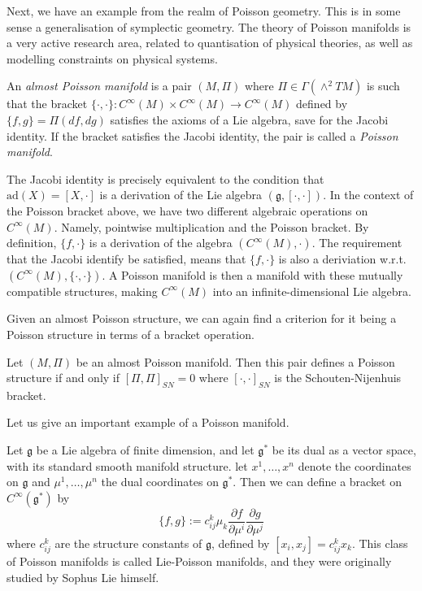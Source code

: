 Next, we have an example from the realm of Poisson geometry. This is in some sense a generalisation of symplectic geometry. The theory of Poisson manifolds is a very active research area, related to quantisation of physical theories, as well as modelling constraints on physical systems.
\begin{definition}
  An \emph{almost Poisson manifold} is a pair $(M,\Pi)$ where $\Pi\in\Gamma(\wedge^2TM)$ is such that the bracket $\{\cdot,\cdot\}:C^\infty(M)\times C^\infty(M)\to C^\infty(M)$ defined by $\{f,g\}=\Pi(df,dg)$ satisfies the axioms of a Lie algebra, save for the Jacobi identity. If the bracket satisfies the Jacobi identity, the pair is called a \emph{Poisson manifold}.
\end{definition}
\begin{remark}
  The Jacobi identity is precisely equivalent to the condition that $\text{ad}(X)=[X,\cdot]$ is a derivation of the Lie algebra $(\mathfrak{g},[\cdot,\cdot])$. In the context of the Poisson bracket above, we have two different algebraic operations on $C^\infty(M)$. Namely, pointwise multiplication and the Poisson bracket. By definition, $\{f,\cdot\}$ is a derivation of the algebra $(C^\infty(M),\cdot)$. The requirement that the Jacobi identify be satisfied, means that $\{f,\cdot\}$ is also a deriviation w.r.t. $(C^\infty(M),\{\cdot,\cdot\})$. A Poisson manifold is then a manifold with these mutually compatible structures, making $C^\infty(M)$ into an infinite-dimensional Lie algebra.
\end{remark}
Given an almost Poisson structure, we can again find a criterion for it being a Poisson structure in terms of a bracket operation.
\begin{theorem}
  Let $(M,\Pi)$ be an almost Poisson manifold. Then this pair defines a Poisson structure if and only if $[\Pi,\Pi]_{SN}=0$ where $[\cdot,\cdot]_{SN}$ is the Schouten-Nijenhuis bracket.
\end{theorem}
Let us give an important example of a Poisson manifold.
\begin{example}
  Let $\mathfrak{g}$ be a Lie algebra of finite dimension, and let $\mathfrak{g}^*$ be its dual as a vector space, with its standard smooth manifold structure. let $x^1,\dots,x^n$ denote the coordinates on $\mathfrak{g}$ and $\mu^1,\dots,\mu^n$ the dual coordinates on $\mathfrak{g}^*$. Then we can define a bracket on $C^\infty(\mathfrak{g}^*)$ by
  $$\{f,g\}:= c_{ij}^k\mu_k\frac{\partial f}{\partial\mu^i}\frac{\partial g}{\partial\mu^j}$$
  where $c_{ij}^k$ are the structure constants of $\mathfrak{g}$, defined by $[x_i,x_j]=c_{ij}^kx_k$. This class of Poisson manifolds is called Lie-Poisson manifolds, and they were originally studied by Sophus Lie himself.
\end{example}
